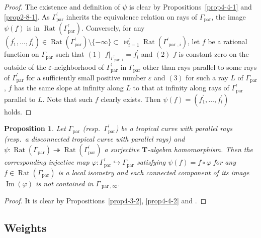 \documentclass[a4paper,12pt]{amsart}
\newtheorem{prop}[dfn]{Proposition}
\def\Gamma{\varGamma}
\begin{document}
\begin{proof}
The existence and definition of $\psi$ is clear by Propositions~\ref{prop4-4-1} and \ref{prop2-8-1}.
As $\Gamma^{\prime}_{\operatorname{par}}$ inherits the equivalence relation on rays of $\Gamma_{\operatorname{par}}$, the image $\psi(f)$ is in $\operatorname{Rat}(\Gamma^{\prime}_{\operatorname{par}})$.
Conversely, for any $(f^{\prime}_1, \ldots, f^{\prime}_l) \in \operatorname{Rat}(\Gamma^{\prime}_{\operatorname{par}}) \setminus \{ -\infty \} \subset \, \bowtie_{i = 1}^l \operatorname{Rat}(\Gamma^{\prime}_{\operatorname{par}, i})$, let $f$ be a rational function on $\Gamma_{\operatorname{par}}$ such that $(1)$ $f|_{\Gamma^{\prime}_{\operatorname{par}, i}} = f^{\prime}_i$ and $(2)$ $f$ is constant zero on the outside of the $\varepsilon$-neighborhood of $\Gamma^{\prime}_{\operatorname{par}}$ in $\Gamma_{\operatorname{par}}$ other than rays parallel to some rays of $\Gamma^{\prime}_{\operatorname{par}}$ for a sufficiently small positive number $\varepsilon$ and $(3)$ for such a ray $L$ of $\Gamma_{\operatorname{par}}$, $f$ has the same slope at infinity along $L$ to that at infinity along rays of $\Gamma^{\prime}_{\operatorname{par}}$ parallel to $L$.
Note that such $f$ clearly exists.
Then $\psi(f) = (f^{\prime}_1, \ldots, f^{\prime}_l)$ holds.
\end{proof}

\begin{prop}
    \label{prop4-4-4}
Let $\Gamma_{\operatorname{par}}$ (resp.~$\Gamma^{\prime}_{\operatorname{par}}$) be a tropical curve with parallel rays (resp.~a disconnected tropical curve with parallel rays) and $\psi : \operatorname{Rat}(\Gamma_{\operatorname{par}}) \twoheadrightarrow \operatorname{Rat}(\Gamma^{\prime}_{\operatorname{par}})$ a surjective $\boldsymbol{T}$-algebra homomorphism.
Then the corresponding injective map $\varphi : \Gamma^{\prime}_{\operatorname{par}} \hookrightarrow \Gamma_{\operatorname{par}}$ satisfying $\psi(f) = f \circ \varphi$ for any $f \in \operatorname{Rat}(\Gamma_{\operatorname{par}})$ is a local isometry and each connected component of its image $\operatorname{Im}(\varphi)$ is not contained in $\Gamma_{\operatorname{par}, \infty}$.
\end{prop}

\begin{proof}
It is clear by Propositions~\ref{prop4-3-2}, \ref{prop4-4-2} and \cite[Theorem~3.14]{JuAe4}.
\end{proof}

\subsection{Weights}
    \label{subsection4.5}
\end{document}

